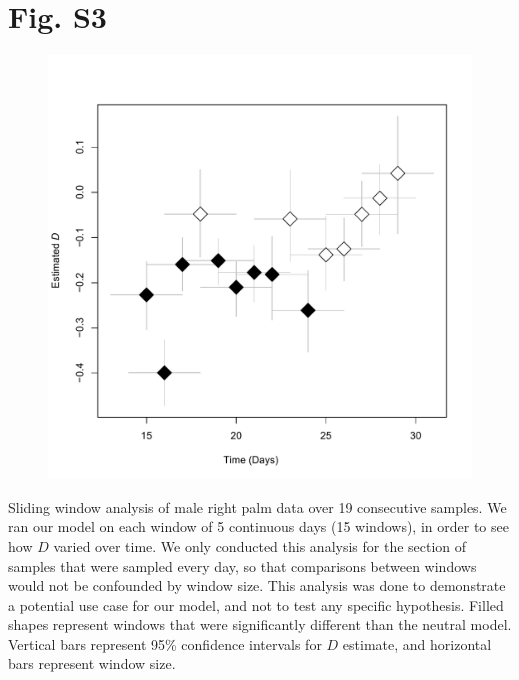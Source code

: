 \documentclass{article}
\begin{document}
\section*{Fig. S3}
\begin{figure}[ht]
	\centering
	\includegraphics[scale=0.80]{../Fig_S3.pdf}
\end{figure}
Sliding window analysis of male right palm data over 19 consecutive samples. We ran our model on each window of 5 continuous days (15 windows), in order to see how \(D\) varied over time. We only conducted this analysis for the section of samples that were sampled every day, so that comparisons between windows would not be confounded by window size. This analysis was done to demonstrate a potential use case for our model, and not to test any specific hypothesis. Filled shapes represent windows that were significantly different than the neutral model. Vertical bars represent 95\% confidence intervals for \(D\) estimate, and horizontal bars represent window size.
\newpage
%
%
\end{document}
